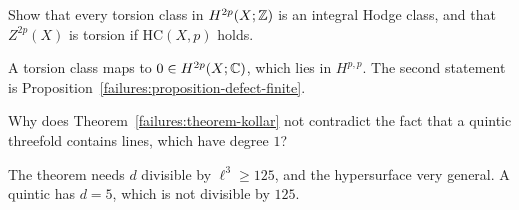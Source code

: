 \begin{exercise}\label{failures:exercise-torsion-hodge}
Show that every torsion class in $H^{2p}(X; \mathbb{Z})$ is an integral Hodge class, and that $Z^{2p}(X)$ is torsion if $\mathrm{HC}(X, p)$ holds.
\end{exercise}

\begin{solution}
A torsion class maps to $0 \in H^{2p}(X; \mathbb{C})$, which lies in $H^{p,p}$. The second statement is Proposition~\ref{failures:proposition-defect-finite}.
\end{solution}

\begin{exercise}\label{failures:exercise-kollar-quintic}
Why does Theorem~\ref{failures:theorem-kollar} not contradict the fact that a quintic threefold contains lines, which have degree $1$?
\end{exercise}

\begin{solution}
The theorem needs $d$ divisible by $\ell^3 \geq 125$, and the hypersurface very general. A quintic has $d = 5$, which is not divisible by $125$.
\end{solution}
